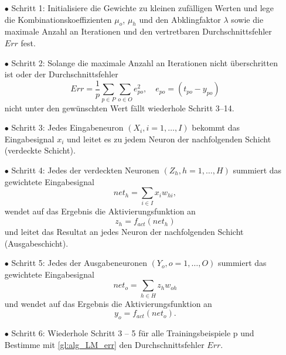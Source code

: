\begin{itemize}
\item[\textbf{$\bullet$}] Schritt 1: Initialisiere die Gewichte zu kleinen zufälligen Werten und lege die Kombinationskoeffizienten $\mu_o$, $\mu_h$ und den Abklingfaktor $\lambda$ sowie die maximale Anzahl an Iterationen und den vertretbaren Durchschnittsfehler $Err$ fest.

\item[\textbf{$\bullet$}] Schritt 2: Solange die maximale Anzahl an Iterationen nicht überschritten ist oder der Durchschnittsfehler
\begin{equation}
Err= \frac{1}{p} \sum\limits_{p \in P} \sum\limits_{o \in O} e_{po}^2, \quad e_{po}=(t_{po}-y_{po})
\label{gl:alg_LM_err}
\end{equation}
nicht unter den gewünschten Wert fällt wiederhole Schritt 3--14.

\item[\textbf{$\bullet$}] Schritt 3: Jedes Eingabeneuron $(X_{i}, i=1,\dots,I)$ bekommt das Eingabesignal $x_{i}$ und leitet es zu jedem Neuron der nachfolgenden Schicht (verdeckte Schicht).

\item[\textbf{$\bullet$}] Schritt 4: Jedes der verdeckten Neuronen $(Z_{h}, h=1,\dots,H)$ summiert das gewichtete Eingabesignal
\begin{equation}
net_{h}=\sum\limits_{i \in I} x_{i}w_{hi},
\end{equation}
wendet auf das Ergebnis die Aktivierungsfunktion an 
\begin{equation}
z_{h}=f_{act}(net_{h})
\end{equation}
und leitet das Resultat an jedes Neuron der nachfolgenden Schicht (Ausgabeschicht).

\item[\textbf{$\bullet$}] Schritt 5: Jedes der Ausgabeneuronen $(Y_{o}, o=1,\dots,O)$ summiert das gewichtete Eingabesignal 
\begin{equation}
net_{o}=\sum\limits_{h \in H} z_{h}w_{oh}
\end{equation}
und wendet auf das Ergebnis die Aktivierungsfunktion an 
\begin{equation}
y_{o}=f_{act}(net_{o}).
\end{equation}

\item[\textbf{$\bullet$}] Schritt 6: Wiederhole Schritt 3 -- 5 für alle Trainingsbeispiele p und Bestimme mit \autoref{gl:alg_LM_err} den Durchschnittsfehler $Err$.


\end{itemize}
